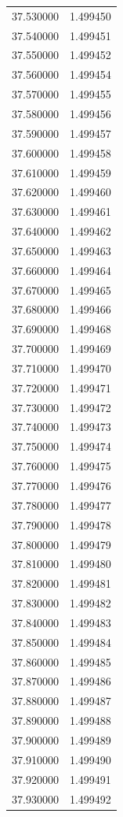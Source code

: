 \begin{tabular}{rr}
37.530000 & 1.499450 \\
37.540000 & 1.499451 \\
37.550000 & 1.499452 \\
37.560000 & 1.499454 \\
37.570000 & 1.499455 \\
37.580000 & 1.499456 \\
37.590000 & 1.499457 \\
37.600000 & 1.499458 \\
37.610000 & 1.499459 \\
37.620000 & 1.499460 \\
37.630000 & 1.499461 \\
37.640000 & 1.499462 \\
37.650000 & 1.499463 \\
37.660000 & 1.499464 \\
37.670000 & 1.499465 \\
37.680000 & 1.499466 \\
37.690000 & 1.499468 \\
37.700000 & 1.499469 \\
37.710000 & 1.499470 \\
37.720000 & 1.499471 \\
37.730000 & 1.499472 \\
37.740000 & 1.499473 \\
37.750000 & 1.499474 \\
37.760000 & 1.499475 \\
37.770000 & 1.499476 \\
37.780000 & 1.499477 \\
37.790000 & 1.499478 \\
37.800000 & 1.499479 \\
37.810000 & 1.499480 \\
37.820000 & 1.499481 \\
37.830000 & 1.499482 \\
37.840000 & 1.499483 \\
37.850000 & 1.499484 \\
37.860000 & 1.499485 \\
37.870000 & 1.499486 \\
37.880000 & 1.499487 \\
37.890000 & 1.499488 \\
37.900000 & 1.499489 \\
37.910000 & 1.499490 \\
37.920000 & 1.499491 \\
37.930000 & 1.499492 \\

\end{tabular}
